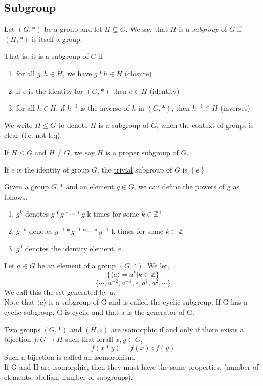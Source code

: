 \subsection{Subgroup}
\begin{definition}
    Let $(G, *)$ be a group and let $H \subseteq G$. We say that $H$ is a \emph{subgroup} of $G$ if $(H, *)$ is itself a group.

    That is, it is a subgroup of $G$ if
    \begin{enumerate}
        \item for all $g,h\in H$, we have $g*h\in H$ (closure)
        \item if $e$ is the identity for $(G, *)$ then $e\in H$ (identity)
        \item for all $h\in H$, if $h^{-1}$ is the inverse of $h$ in $(G, *)$, then $h^{-1}\in H$ (inverses)
    \end{enumerate}

    We write $H \leq G$ to denote $H$ is a subgroup of $G$, when the context of groups is clear (i.e. not leq).

    If $H\leq G$ and $H \neq G$, we say $H$ is a \underline{proper} subgroup of $G$.

    If $e$ is the identity of group $G$, the \underline{trivial} subgroup of $G$ is $\left\{e\right\}$.
\end{definition}
\begin{definition}
    Given a group \(G, *\) and an element \(g \in G\), we can define the powers of g as follows.\\
    \begin{enumerate}
        \item \(g^k\) denotes \(g*g*\cdots*g\) k times for some \(k\in \mathbb Z^+\)
        \item \(g^{-k}\) denotes \(g^{-1}*g^{-1}*\cdots*g^{-1}\) k times for some \(k\in \mathbb Z^+\)
        \item \(g^0\) denotes the identity element, e.
    \end{enumerate}
\end{definition}
\begin{definition}
    Let \(a\in  G\) be an element of a group \((G, *)\). We let,
        \[\{\langle a \rangle = a^k | k\in \mathbb Z\}\]
        \[\{\cdots, a^{-2}, a^{-1}, e, a^1, a^2, \cdots\}\]
    We call this the set generated by a. \\
    Note that \(\langle a \rangle\) is a subgroup of G and is called the cyclic subgroup. If G has a cyclic subgroup, G is cyclic and that a is the generator of G.
\end{definition}
\begin{definition}
    Two groups \((G, *)\) and \((H, \circ)\) are isomorphic if and only if there exists a bijection \(f: G\to H\) such that forall \(x, y \in G\), \[f(x*y) = f(x)\circ f(y)\]
    Such a bijection is called an isomorphism.\\
    If G and H are isomorphic, then they must have the same properties. (number of elements, abelian, number of subgroups).\\
\end{definition}

